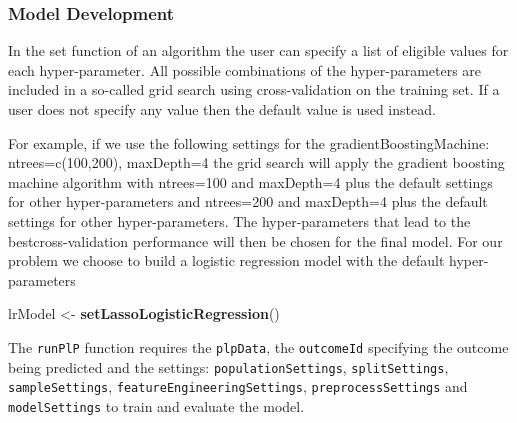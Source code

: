 \documentclass[
]{article}
\newenvironment{Shaded}{\begin{snugshade}}{\end{snugshade}}
\newcommand{\FunctionTok}[1]{\textcolor[rgb]{0.13,0.29,0.53}{\textbf{#1}}}
\newcommand{\NormalTok}[1]{#1}
\newcommand{\OtherTok}[1]{\textcolor[rgb]{0.56,0.35,0.01}{#1}}
\begin{document}
\hypertarget{model-development}{%
\subsubsection{Model Development}\label{model-development}}

In the set function of an algorithm the user can specify a list of
eligible values for each hyper-parameter. All possible combinations of
the hyper-parameters are included in a so-called grid search using
cross-validation on the training set. If a user does not specify any
value then the default value is used instead.

For example, if we use the following settings for the
gradientBoostingMachine: ntrees=c(100,200), maxDepth=4 the grid search
will apply the gradient boosting machine algorithm with ntrees=100 and
maxDepth=4 plus the default settings for other hyper-parameters and
ntrees=200 and maxDepth=4 plus the default settings for other
hyper-parameters. The hyper-parameters that lead to the
bestcross-validation performance will then be chosen for the final
model. For our problem we choose to build a logistic regression model
with the default hyper-parameters

\begin{Shaded}
\begin{Highlighting}[]
\NormalTok{lrModel }\OtherTok{\textless{}{-}} \FunctionTok{setLassoLogisticRegression}\NormalTok{()}
\end{Highlighting}
\end{Shaded}

The \texttt{runPlP} function requires the \texttt{plpData}, the
\texttt{outcomeId} specifying the outcome being predicted and the
settings: \texttt{populationSettings}, \texttt{splitSettings},
\texttt{sampleSettings}, \texttt{featureEngineeringSettings},
\texttt{preprocessSettings} and \texttt{modelSettings} to train and
evaluate the model.
\end{document}
